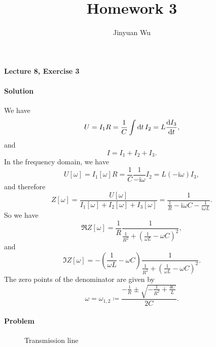 \documentclass[hyperref, a4paper]{article}
\title{Homework 3}
\author{Jinyuan Wu}
\newcommand*{\ii}{\mathrm{i}}
\begin{document}
\maketitle

\paragraph{Lecture 8, Exercise 3}

\paragraph{Solution} We have 
\[
    U = I_1 R = \frac{1}{C} \int \dd{t} I_2 = L \dv{I_3}{t},
\]
and 
\[
    I = I_1 + I_2 + I_3.
\]
In the frequency domain, we have 
\[
    U[\omega] = I_1[\omega] R = \frac{1}{C} \frac{1}{- \ii \omega} I_2 = L (- \ii \omega) I_3,
\]
and therefore 
\begin{equation}
    Z[\omega] = \frac{U[\omega]}{I_1[\omega] + I_2[\omega] + I_3[\omega]} 
    = \frac{1}{\frac{1}{R} - \ii \omega C - \frac{1}{\ii \omega L}}.
\end{equation}
So we have 
\begin{equation}
    \Re Z[\omega] = \frac{1}{R} \frac{1}{\frac{1}{R^2} + \left( \frac{1}{\omega L} - \omega C \right)^2},
\end{equation}
and 
\begin{equation}
    \Im Z[\omega] = - \left( \frac{1}{\omega L} - \omega C \right) \frac{1}{\frac{1}{R^2} + \left( \frac{1}{\omega L} - \omega C \right)^2}.
\end{equation}
The zero points of the denominator are given by 
\begin{equation}
    \omega = \omega_{1, 2} \coloneqq \frac{- \frac{\ii}{R} \pm \sqrt{- \frac{1}{R^2} + \frac{4C}{L}}}{2 C}.
\end{equation}

\paragraph{Problem} 

\begin{figure}
    \centering
    
    \caption{Transmission line}
    \label{fig:transmission}
\end{figure}
\end{document}
